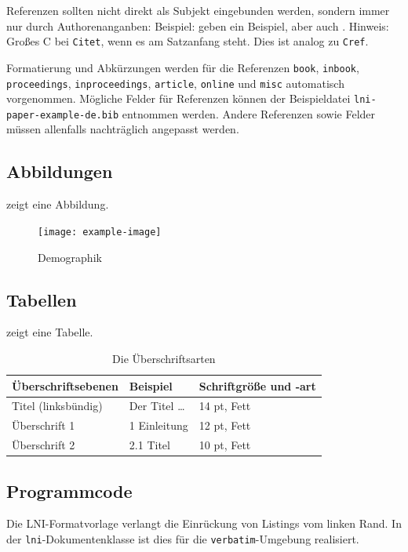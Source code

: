 \documentclass[utf8,biblatex]{lni}
\begin{document}
Referenzen sollten nicht direkt als Subjekt eingebunden werden, sondern immer nur durch Authorenanganben:
Beispiel:  geben ein Beispiel, aber auch \citet{Az09}.
Hinweis: Großes C bei \texttt{Citet}, wenn es am Satzanfang steht. Dies ist analog zu \texttt{Cref}.

Formatierung und Abkürzungen werden für die Referenzen \texttt{book}, \texttt{inbook}, \texttt{proceedings}, \texttt{inproceedings}, \texttt{article}, \texttt{online} und \texttt{misc} automatisch vorgenommen.
Mögliche Felder für Referenzen können der Beispieldatei \texttt{lni-paper-example-de.bib} entnommen werden.
Andere Referenzen sowie Felder müssen allenfalls nachträglich angepasst werden.

\subsection{Abbildungen}
 zeigt eine Abbildung.

\begin{figure}
  \centering
  \texttt{[image: example-image]}
  \caption{Demographik}
  \label{fig:demo}
\end{figure}

\subsection{Tabellen}
 zeigt eine Tabelle.

\begin{table}
\centering
\begin{tabular}{lll}
\toprule
Überschriftsebenen & Beispiel & Schriftgröße und -art \\
\midrule
Titel (linksbündig) & Der Titel \ldots & 14 pt, Fett\\
Überschrift 1 & 1 Einleitung & 12 pt, Fett\\
Überschrift 2 & 2.1 Titel & 10 pt, Fett\\
\bottomrule
\end{tabular}
\caption{Die Überschriftsarten}
\label{tab:demo}
\end{table}

\subsection{Programmcode}
Die LNI-Formatvorlage verlangt die Einrückung von Listings vom linken Rand.
In der \texttt{lni}-Dokumentenklasse ist dies für die \texttt{verbatim}-Umgebung realisiert.
\end{document}
